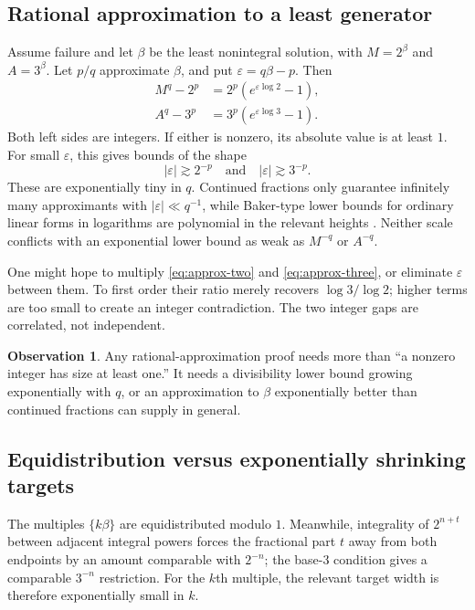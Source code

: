 \documentclass[11pt,oneside]{article}
\theoremstyle{definition}
\newtheorem{observation}[theorem]{Observation}
\theoremstyle{remark}
\begin{document}
\subsection{Rational approximation to a least generator}

Assume failure and let $\beta$ be the least nonintegral solution, with
$M=2^\beta$ and $A=3^\beta$.  Let $p/q$ approximate $\beta$, and put
$\varepsilon=q\beta-p$.  Then
\begin{align}
 M^q-2^p
  &=2^p\left(e^{\varepsilon\log2}-1\right),
 \label{eq:approx-two}\\
 A^q-3^p
  &=3^p\left(e^{\varepsilon\log3}-1\right).
 \label{eq:approx-three}
\end{align}
Both left sides are integers.  If either is nonzero, its absolute value is at least $1$.
For small $\varepsilon$, this gives bounds of the shape
\[
 |\varepsilon|\gtrsim 2^{-p}
 \quad\text{and}\quad
 |\varepsilon|\gtrsim 3^{-p}.
\]
These are exponentially tiny in $q$.  Continued fractions only guarantee infinitely many
approximants with $|\varepsilon|\ll q^{-1}$, while Baker-type lower bounds for ordinary linear
forms in logarithms are polynomial in the relevant heights \cite{Baker1975,Waldschmidt2000}.  Neither scale conflicts with an
exponential lower bound as weak as $M^{-q}$ or $A^{-q}$.

One might hope to multiply \eqref{eq:approx-two} and \eqref{eq:approx-three}, or eliminate
$\varepsilon$ between them.  To first order their ratio merely recovers
$\log3/\log2$; higher terms are too small to create an integer contradiction.  The two
integer gaps are correlated, not independent.

\begin{observation}
Any rational-approximation proof needs more than ``a nonzero integer has size at least one.''
It needs a divisibility lower bound growing exponentially with $q$, or an approximation to
$\beta$ exponentially better than continued fractions can supply in general.
\end{observation}

\subsection{Equidistribution versus exponentially shrinking targets}

The multiples $\{k\beta\}$ are equidistributed modulo $1$.  Meanwhile, integrality of
$2^{n+t}$ between adjacent integral powers forces the fractional part $t$ away from both
endpoints by an amount comparable with $2^{-n}$; the base-$3$ condition gives a comparable
$3^{-n}$ restriction.  For the $k$th multiple, the relevant target width is therefore
exponentially small in $k$.
\end{document}
